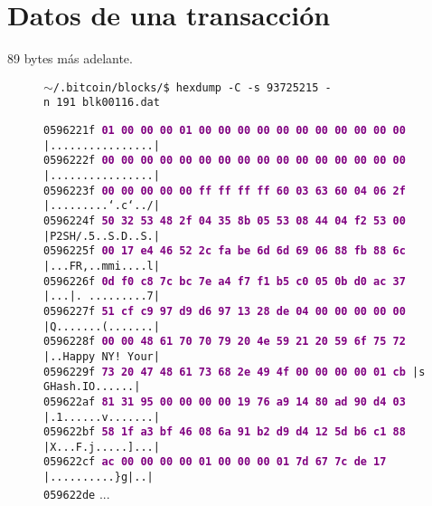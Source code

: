 \documentclass{article}
\begin{document}
\section{Datos de una transacción}
89 bytes más adelante.
\begin{figure}[H]
\scriptsize{\texttt{$\sim$/.bitcoin/blocks/\$ hexdump\ -C\ -s\ 93725215\ -n\ 191\ blk00116.dat}}
    
    \scriptsize{
    \texttt{0596221f  \textbf{\textcolor{purple}{01 00 00 00 01 00 00 00  00 00 00 00 00 00 00 00}}  |................|} \\
    \texttt{0596222f  \textbf{\textcolor{purple}{00 00 00 00 00 00 00 00  00 00 00 00 00 00 00 00}}  |................|} \\
    \texttt{0596223f  \textbf{\textcolor{purple}{00 00 00 00 00 ff ff ff  ff 60 03 63 60 04 06 2f}}  |.........`.c`../|} \\
    \texttt{0596224f  \textbf{\textcolor{purple}{50 32 53 48 2f 04 35 8b  05 53 08 44 04 f2 53 00}}  |P2SH/.5..S.D..S.|} \\
    \texttt{0596225f  \textbf{\textcolor{purple}{00 17 e4 46 52 2c fa be  6d 6d 69 06 88 fb 88 6c}}  |...FR,..mmi....l|} \\
    \texttt{0596226f  \textbf{\textcolor{purple}{0d f0 c8 7c bc 7e a4 f7  f1 b5 c0 05 0b d0 ac 37}}  |...|.~.........7|} \\
    \texttt{0596227f  \textbf{\textcolor{purple}{51 cf c9 97 d9 d6 97 13  28 de 04 00 00 00 00 00}}  |Q.......(.......|} \\
    \texttt{0596228f  \textbf{\textcolor{purple}{00 00 48 61 70 70 79 20  4e 59 21 20 59 6f 75 72}}  |..Happy NY! Your|} \\
    \texttt{0596229f  \textbf{\textcolor{purple}{73 20 47 48 61 73 68 2e  49 4f 00 00 00 00 01 cb}}  |s GHash.IO......|} \\
    \texttt{059622af  \textbf{\textcolor{purple}{81 31 95 00 00 00 00 19  76 a9 14 80 ad 90 d4 03}}  |.1......v.......|} \\
    \texttt{059622bf  \textbf{\textcolor{purple}{58 1f a3 bf 46 08 6a 91  b2 d9 d4 12 5d b6 c1 88}}  |X...F.j.....]...|} \\
    \texttt{059622cf  \textbf{\textcolor{purple}{ac 00 00 00 00 01 00 00  00 01 7d 67 7c de 17 \ \ }}  |..........\}g|..|} \\
    \texttt{059622de} ...}
\end{figure}
\end{document}
